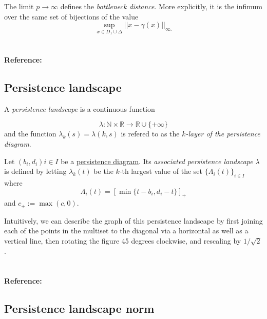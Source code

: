 \documentclass{amsart}
\begin{document}
	The limit $p \to \infty$ defines the \textit{bottleneck distance}. More explicitly, it is the infimum over the same set of bijections of the value
	\begin{equation*}
	\sup_{x \in D_1 \cup \Delta} ||x - \gamma(x)||_{\infty.}
	\end{equation*}
	
	\paragraph{\\ Reference:} \cite{kerber2017geometry}
	
	\subsection*{Persistence landscape} \label{persistence landscape}
	
	A \textit{persistence landscape} is a continuous function
	
	\begin{equation*}
	\lambda : \mathbb N \times \mathbb R \to \mathbb R \cup \{+\infty\}
	\end{equation*}
	and the function $\lambda_k(s) = \lambda(k,s)$ is refered to as the \textit{$k$-layer of the persistence diagram}.
	
	Let ${(b_i, d_i)}{i \in I}$ be a \hyperref[persistence diagram] {persistence diagram}. Its \textit{associated persistence landscape} $\lambda$ is defined by letting $\lambda_k(t)$ be the $k$-th largest value of the set $\{\Lambda_i(t)\}_ {i \in I}$ where
	\begin{equation*}
	\Lambda_i(t) = \left[ \min \{t-b_i, d_i-t\}\right]_+
	\end{equation*}
	and $c_+ := \max(c,0)$.
	
	Intuitively, we can describe the graph of this persistence landscape by first joining each of the points in the multiset to the diagonal via a horizontal as well as a vertical line, then rotating the figure 45 degrees clockwise, and rescaling by $1/\sqrt{2}$.
	
	\paragraph{\\ Reference:} \cite{bubenik2015statistical}
	
	\subsection*{Persistence landscape norm} \label{persistence landscape norm}
	
\end{document}
